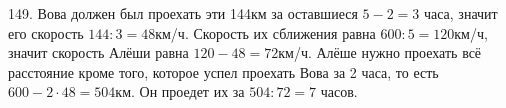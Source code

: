 149. Вова должен был проехать эти 144км за оставшиеся $5-2=3$ часа, значит его скорость $144:3=48$км/ч. Скорость их сближения равна $600:5=120$км/ч, значит скорость Алёши равна $120-48=72$км/ч. Алёше нужно проехать всё расстояние кроме того, которое успел проехать Вова за 2 часа, то есть $600-2\cdot48=504$км. Он проедет их за $504:72=7$ часов.\\

